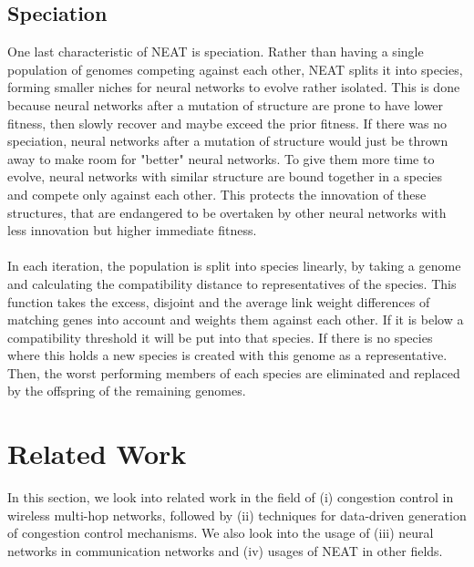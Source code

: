 \section{Speciation}\label{sec:speciation}
One last characteristic of NEAT is speciation. Rather than having a single population of genomes competing against each other, NEAT splits it into species, forming smaller niches for neural networks to evolve rather isolated. This is done because neural networks after a mutation of structure are prone to have lower fitness, then slowly recover and maybe exceed the prior fitness. If there was no speciation, neural networks after a mutation of structure would just be thrown away to make room for "better" neural networks. To give them more time to evolve, neural networks with similar structure are bound together in a species and compete only against each other. This protects the innovation of these structures, that are endangered to be overtaken by other neural networks with less innovation but higher immediate fitness. \\\\
In each iteration, the population is split into species linearly, by taking a genome and calculating the compatibility distance to representatives of the species. This function takes the excess, disjoint and the average link weight differences of matching genes into account and weights them against each other. If it is below a compatibility threshold it will be put into that species. If there is no species where this holds a new species is created with this genome as a representative. Then, the worst performing members of each species are eliminated and replaced by the offspring of the remaining genomes. 





\chapter{Related Work}\label{ch:relatedwork}
\glsresetall %

In this section, we look into related work in the field of (i) congestion control in wireless multi-hop networks, followed by (ii) techniques for data-driven generation of congestion control mechanisms. We also look into the usage of (iii) neural networks in communication networks and (iv) usages of NEAT in other fields.

